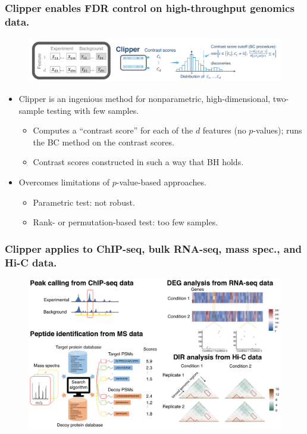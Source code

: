 \documentclass{beamer}
\begin{document}
\begin{frame}
\frametitle{Clipper enables FDR control on high-throughput genomics data.}

\begin{figure}
	\centering
	\includegraphics[width=1\linewidth]{clipper_1}
	\label{clipper1}
\end{figure}

\begin{itemize}
\item Clipper is an ingenious method for nonparametric, high-dimensional, two-sample testing with few samples.
\begin{itemize}
\item Computes a ``contrast score'' for each of the $d$ features (no $p$-values); runs the BC method on the contrast scores.
\item Contrast scores constructed in such a way that BH holds.
\end{itemize}
\item Overcomes limitations of $p$-value-based approaches.
\begin{itemize}
\item Parametric test: not robust.
\item Rank- or permutation-based test: too few samples.
\end{itemize}
\end{itemize}
\end{frame}

\begin{frame}
\frametitle{Clipper applies to ChIP-seq, bulk RNA-seq, mass spec., and Hi-C data.}

\begin{figure}
	\centering
	\includegraphics[width=1\linewidth]{clipper_2}
	\label{clipper2}
\end{figure}

\end{frame}

\printbibliography
\end{document}
